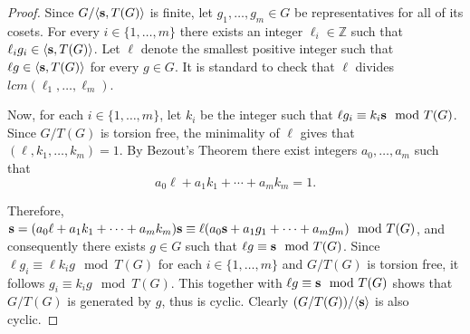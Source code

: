 \documentclass{daj}
\theoremstyle{plain}
\theoremstyle{definition}
\begin{document}
\begin{proof}  
	Since $G \slash \langle {\bf s}, T(G)\rangle$ is finite, let  $g_{1}, \ldots, g_{m} \in G$ be representatives  for all of its cosets. For every $i \in \{1, \ldots, m\}$ there exists an integer $\ell_{i} \in \mathbb{Z}$ such that $\ell_{i}g_{i} \in \langle {\bf s}, T(G) \rangle$.  Let $\ell$ denote the smallest positive integer such that $\ell g \in \langle {\bf s}, T(G)  \rangle$ for every $g \in G$. It is standard to check that $\ell$ divides  $lcm(\ell_{1}, \ldots, \ell_{m})$. 
	
	
	Now, for each $i\in \{1,\ldots, m\}$, let $k_{i}$ be the integer such that $\ell g_{i} \equiv  k_{i}{\bf s} \mod T(G)$. Since $G/T(G)$ is torsion free,  the minimality of $\ell$ gives that \\ 
	$(\ell, k_{1}, \ldots, k_{m}) =1$. By Bezout's Theorem there exist integers $a_{0}, \ldots, a_{m}$ such that 
	$$a_{0}\ell + a_{1}k_{1} + \cdots + a_{m}k_m =1.$$ 
	
	
	Therefore, ${\bf s} = (a_{0}\ell + a_{1}k_{1} + \cdots + a_{m}k_m){\bf s}\equiv \ell(a_{0} {\bf s}  + a_{1}g_{1} + \cdots + a_{m}g_m) \mod T(G)$, and consequently there exists $g \in G$ such that $\ell g \equiv {\bf s} \mod T(G)$.  Since $\ell g_{i} \equiv  \ell k_{i}  g \mod T(G)$ for each $i \in \{ 1, \ldots, m\}$ and $G/T(G)$ is torsion free,  it follows $g_{i} \equiv k_{i}g \mod T(G)$. This together with $\ell g \equiv {\bf s} \mod T(G)$ shows that $G/T(G)$ is generated by $g$, thus is cyclic. Clearly $(G/T(G) )\slash \langle {\bf s} \rangle$ is also cyclic.  
\end{proof} 
\end{document}
